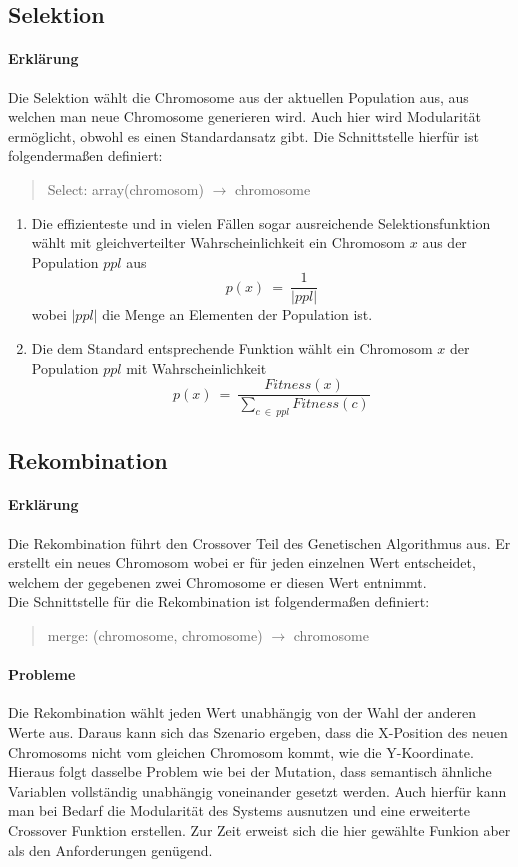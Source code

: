 \documentclass[12pt,a4paper]{scrartcl}
\begin{document}
\subsection{Selektion}
\paragraph{Erklärung}
Die Selektion wählt die Chromosome aus der aktuellen Population aus, aus welchen man neue Chromosome generieren wird. Auch hier wird Modularität ermöglicht, obwohl es einen Standardansatz gibt. Die Schnittstelle hierfür ist folgendermaßen definiert:
\begin{quote}
 \textsf{Select: array(chromosom) $\rightarrow$ chromosome}
\end{quote}
\begin{enumerate}
	\item Die effizienteste und in vielen Fällen sogar ausreichende Selektionsfunktion wählt mit gleichverteilter Wahrscheinlichkeit ein Chromosom $x$ aus der Population $ppl$ aus $$p(x) ~=~ \frac{1}{|ppl|}$$ wobei $|ppl|$ die Menge an Elementen der Population ist.
	\item Die dem Standard entsprechende Funktion wählt ein Chromosom $x$ der Population $ppl$ mit Wahrscheinlichkeit $$p(x)~=~\frac{Fitness(x)}{\sum_{c ~\in~ ppl}^{}{Fitness(c)}}$$
\end{enumerate}

\subsection{Rekombination}
\paragraph{Erklärung}
Die Rekombination führt den Crossover Teil des Genetischen Algorithmus aus. Er erstellt ein neues Chromosom wobei er für jeden einzelnen Wert entscheidet, welchem der gegebenen zwei Chromosome er diesen Wert entnimmt.\\
Die Schnittstelle für die Rekombination ist folgendermaßen definiert: 
\begin{quote}
	\textsf{merge: (chromosome, chromosome) $\rightarrow$ chromosome}
\end{quote}
\paragraph{Probleme} Die Rekombination wählt jeden Wert unabhängig von der Wahl der anderen Werte aus. Daraus kann sich das Szenario ergeben, dass die X-Position des neuen Chromosoms nicht vom gleichen Chromosom kommt, wie die Y-Koordinate. Hieraus folgt dasselbe Problem wie bei der Mutation, dass semantisch ähnliche Variablen vollständig unabhängig voneinander gesetzt werden. Auch hierfür kann man bei Bedarf die Modularität des Systems ausnutzen und eine erweiterte Crossover Funktion erstellen. Zur Zeit erweist sich die hier gewählte Funkion aber als den Anforderungen genügend.
\end{document}
